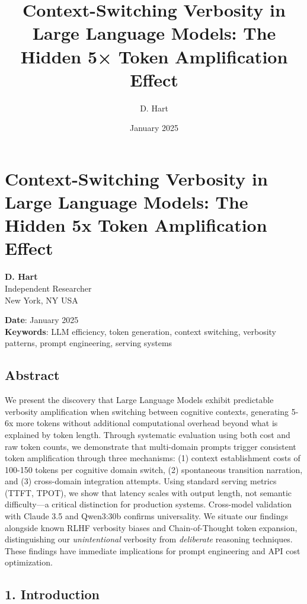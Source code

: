 \documentclass[
  11pt]{article}
\title{Context-Switching Verbosity in Large Language Models: The Hidden
5× Token Amplification Effect}
\author{D. Hart}
\date{January 2025}
\begin{document}
\maketitle

\section{Context-Switching Verbosity in Large Language Models: The
Hidden 5x Token Amplification
Effect}\label{context-switching-verbosity-in-large-language-models-the-hidden-5x-token-amplification-effect}

\textbf{D. Hart}\\
Independent Researcher\\
New York, NY USA

\textbf{Date}: January 2025\\
\textbf{Keywords}: LLM efficiency, token generation, context switching,
verbosity patterns, prompt engineering, serving systems

\subsection{Abstract}\label{abstract}

We present the discovery that Large Language Models exhibit predictable
verbosity amplification when switching between cognitive contexts,
generating 5-6x more tokens without additional computational overhead
beyond what is explained by token length. Through systematic evaluation
using both cost and raw token counts, we demonstrate that multi-domain
prompts trigger consistent token amplification through three mechanisms:
(1) context establishment costs of 100-150 tokens per cognitive domain
switch, (2) spontaneous transition narration, and (3) cross-domain
integration attempts. Using standard serving metrics (TTFT, TPOT), we
show that latency scales with output length, not semantic difficulty---a
critical distinction for production systems. Cross-model validation with
Claude 3.5 and Qwen3:30b confirms universality. We situate our findings
alongside known RLHF verbosity biases and Chain-of-Thought token
expansion, distinguishing our \emph{unintentional} verbosity from
\emph{deliberate} reasoning techniques. These findings have immediate
implications for prompt engineering and API cost optimization.

\subsection{1. Introduction}\label{introduction}
\end{document}
